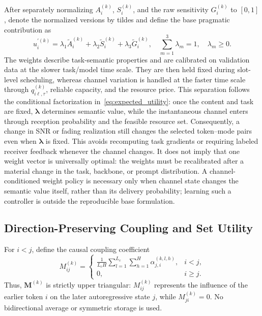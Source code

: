 \documentclass[journal]{IEEEtran}
\begin{document}
After separately normalizing $A_i^{(k)}$, $S_i^{(k)}$, and the raw sensitivity $G_i^{(k)}$ to $[0,1]$, denote the normalized versions by tildes and define the base pragmatic contribution as
\begin{equation}
u_i^{\prime(k)}
=\lambda_1\widetilde A_i^{(k)}
+\lambda_2\widetilde S_i^{(k)}
+\lambda_3\widetilde G_i^{(k)},
\quad
\sum_{m=1}^{3}\lambda_m=1,
\quad \lambda_m\geq0.
\label{eq:base_utility}
\end{equation}
The weights describe task-semantic properties and are calibrated on validation data at the slower task/model time scale. They are then held fixed during slot-level scheduling, whereas channel variation is handled at the faster time scale through $q_{i\ell,\tau}^{(k)}$, reliable capacity, and the resource price. This separation follows the conditional factorization in~\eqref{eq:expected_utility}: once the content and task are fixed, $\bm\lambda$ determines semantic value, while the instantaneous channel enters through reception probability and the feasible resource set. Consequently, a change in SNR or fading realization still changes the selected token--mode pairs even when $\bm\lambda$ is fixed. This avoids recomputing task gradients or requiring labeled receiver feedback whenever the channel changes. It does not imply that one weight vector is universally optimal: the weights must be recalibrated after a material change in the task, backbone, or prompt distribution. A channel-conditioned weight policy is necessary only when channel state changes the semantic value itself, rather than its delivery probability; learning such a controller is outside the reproducible base formulation.

\subsection{Direction-Preserving Coupling and Set Utility}

For $i<j$, define the causal coupling coefficient
\begin{equation}
M_{ij}^{(k)}=
\begin{cases}
\displaystyle\frac{1}{L_cH}\sum_{l=1}^{L_c}\sum_{h=1}^{H}
\alpha_{j,i}^{(k,l,h)},&i<j,\\[0.55em]
0,&i\geq j.
\end{cases}
\label{eq:coupling_matrix}
\end{equation}
Thus, $\bm M^{(k)}$ is strictly upper triangular: $M_{ij}^{(k)}$ represents the influence of the earlier token $i$ on the later autoregressive state $j$, while $M_{ji}^{(k)}=0$. No bidirectional average or symmetric storage is used.
\end{document}
